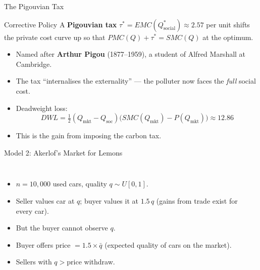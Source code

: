 \documentclass[aspectratio=169, 10pt]{beamer}
\begin{document}
\begin{frame}{The Pigouvian Tax}
\begin{block}{Corrective Policy}
A \textbf{Pigouvian tax} $\tau^* = EMC(Q^*_{\text{social}}) \approx 2.57$
per unit shifts the private cost curve up so that
$PMC(Q) + \tau^* = SMC(Q)$ at the optimum.
\end{block}
\vspace{0.5em}
\begin{itemize}
  \item Named after \textbf{Arthur Pigou} (1877--1959), a student of
        Alfred Marshall at Cambridge.
  \item The tax ``internalises the externality'' --- the polluter now
        faces the \textit{full} social cost.
  \item Deadweight loss:
  \[
    DWL = \tfrac{1}{2}(Q_{\text{mkt}} - Q_{\text{soc}})
          \bigl(SMC(Q_{\text{mkt}}) - P(Q_{\text{mkt}})\bigr)
        \approx 12.86
  \]
  \item This is the gain from imposing the carbon tax.
\end{itemize}
\end{frame}

\begin{frame}{Model 2: Akerlof's Market for Lemons}
\begin{columns}[T]
\begin{itemize}
  \item $n = 10{,}000$ used cars, quality $q \sim U[0,1]$.
  \item Seller values car at $q$; buyer values it at $1.5\,q$
        (gains from trade exist for every car).
  \item But the buyer \alert{cannot observe} $q$.
  \item Buyer offers price $= 1.5 \times \bar{q}$
        (expected quality of cars on the market).
  \item Sellers with $q > \text{price}$ withdraw.
\end{itemize}
\begin{center}
\end{center}
\end{columns}
\end{frame}
\end{document}
